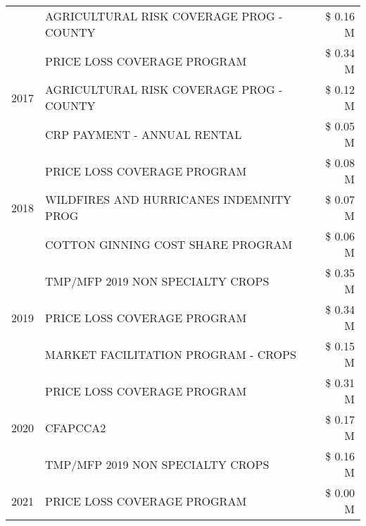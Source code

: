 \begin{tabular}{llr}
 & AGRICULTURAL RISK COVERAGE PROG - COUNTY      & \$ 0.16 M \\
\cline{1-3}
\multirow[t]{3}{*}{2017} & PRICE LOSS COVERAGE PROGRAM & \$ 0.34 M \\
 & AGRICULTURAL RISK COVERAGE PROG - COUNTY & \$ 0.12 M \\
 & CRP PAYMENT - ANNUAL RENTAL & \$ 0.05 M \\
\cline{1-3}
\multirow[t]{3}{*}{2018} & PRICE LOSS COVERAGE PROGRAM & \$ 0.08 M \\
 & WILDFIRES AND HURRICANES INDEMNITY PROG & \$ 0.07 M \\
 & COTTON GINNING COST SHARE PROGRAM & \$ 0.06 M \\
\cline{1-3}
\multirow[t]{3}{*}{2019} & TMP/MFP 2019 NON SPECIALTY CROPS & \$ 0.35 M \\
 & PRICE LOSS COVERAGE PROGRAM & \$ 0.34 M \\
 & MARKET FACILITATION PROGRAM - CROPS & \$ 0.15 M \\
\cline{1-3}
\multirow[t]{3}{*}{2020} & PRICE LOSS COVERAGE PROGRAM & \$ 0.31 M \\
 & CFAPCCA2 & \$ 0.17 M \\
 & TMP/MFP 2019 NON SPECIALTY CROPS & \$ 0.16 M \\
\cline{1-3}
2021 & PRICE LOSS COVERAGE PROGRAM & \$ 0.00 M \\
\cline{1-3}
\bottomrule
\end{tabular}
